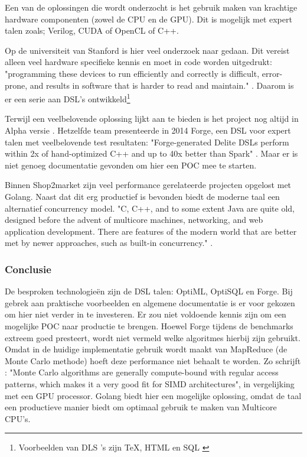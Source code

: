 Een van de oplossingen die wordt onderzocht is het gebruik maken van krachtige hardware componenten (zowel de CPU en de GPU). Dit is mogelijk met expert talen zoals; Verilog, CUDA of OpenCL of C++.


Op de universiteit van Stanford is hier veel onderzoek naar gedaan. Dit vereist alleen veel hardware specifieke kennis en moet in code worden uitgedrukt: "programming these devices to run efficiently and correctly is difficult, error-prone, and results in software that is harder to read and maintain." \parencite{sujeeth2011optiml}. Daarom is er een serie aan DSL's ontwikkeld\footnote{Voorbeelden van DLS 's zijn \TeX, HTML en SQL  \parencite{sigplan2000dsl}}

Terwijl \textcite{sujeeth2011optiml} een veelbelovende oplossing lijkt aan te bieden is het project nog altijd in Alpha versie \parencite{optiml_project_home}. Hetzelfde team presenteerde in 2014 Forge, een DSL voor expert talen met veelbelovende test resultaten: "Forge-generated Delite DSLs perform within 2x of hand-optimized C++ and up to 40x better than Spark" \parencite{sujeeth2014forge}. Maar er is niet genoeg documentatie gevonden om hier een POC mee te starten.

Binnen Shop2market zijn veel performance gerelateerde projecten opgelost met Golang. Naast dat dit erg productief is bevonden biedt de moderne taal een alternatief concurrency model. "C, C++, and to some extent Java are quite old, designed before the advent of multicore machines, networking, and web application development. There are features of the modern world that are better met by newer approaches, such as built-in concurrency." \parencite{pike2012go}.

\subsubsection{\textbf{Conclusie}}

De besproken technologieën zijn de DSL talen: OptiML, OptiSQL en Forge. Bij gebrek aan praktische voorbeelden en algemene documentatie is er voor gekozen om hier niet verder in te investeren. Er zou niet voldoende kennis zijn om een mogelijke POC naar productie te brengen. Hoewel Forge tijdens de benchmarks extreem goed presteert, wordt niet vermeld welke algoritmes hierbij zijn gebruikt. Omdat in de huidige implementatie gebruik wordt maakt van MapReduce (de Monte Carlo methode) hoeft deze performance niet behaalt te worden. Zo schrijft \textcite{lee2010debunking}: "Monte Carlo algorithms are generally compute-bound with regular access patterns, which makes it a very good fit for SIMD architectures", in vergelijking met een GPU processor. Golang biedt hier een mogelijke oplossing, omdat de taal een productieve manier biedt om optimaal gebruik te maken van Multicore CPU's.